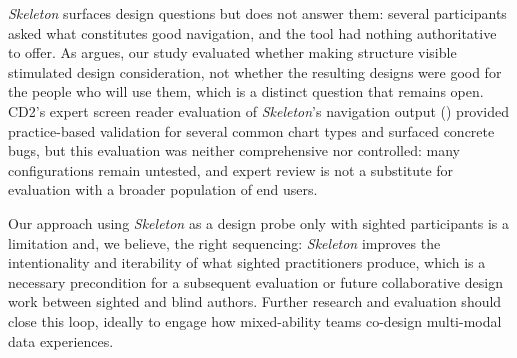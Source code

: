 \documentclass[12pt]{cmuthesis}
\begin{document}
\textit{Skeleton} surfaces design questions but does not answer them: several participants asked what constitutes good navigation, and the tool had nothing authoritative to offer. As  argues, our study evaluated whether making structure visible stimulated design consideration, not whether the resulting designs were good for the people who will use them, which is a distinct question that remains open. CD2's expert screen reader evaluation of \textit{Skeleton}'s navigation output () provided practice-based validation for several common chart types and surfaced concrete bugs, but this evaluation was neither comprehensive nor controlled: many configurations remain untested, and expert review is not a substitute for evaluation with a broader population of end users.


Our approach using \textit{Skeleton} as a design probe only with sighted participants is a limitation and, we believe, the right sequencing: \textit{Skeleton} improves the intentionality and iterability of what sighted practitioners produce, which is a necessary precondition for a subsequent evaluation or future collaborative design work between sighted and blind authors. Further research and evaluation should close this loop, ideally to engage how mixed-ability teams co-design multi-modal data experiences.





\end{document}
